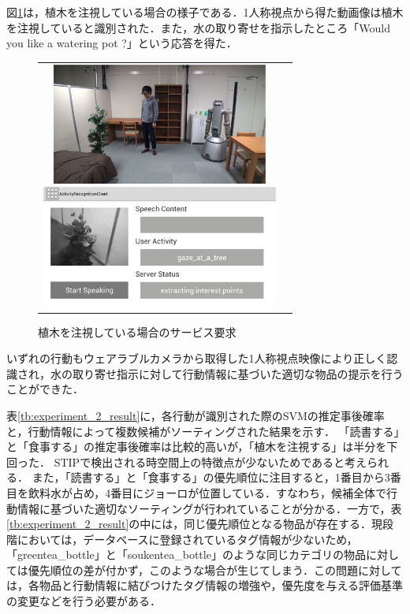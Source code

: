 \newpage
図{\ref{fig:experiment_2_water_3}}は，植木を注視している場合の様子である．1人称視点から得た動画像は植木を注視していると識別された．また，水の取り寄せを指示したところ「Would you like a watering pot ?」という応答を得た．
%
\vspace{5mm}
\begin{figure}[htbp]
\begin{tabular}{cc}
%
  \begin{minipage}{0.5\textwidth}
    \begin{center}
      \includegraphics[height=40mm]{figure/experiment_2_water_3.eps}
    \end{center}
  \end{minipage}
%
  \begin{minipage}{0.5\textwidth}
    \begin{center}
      \includegraphics[height=40mm]{figure/experiment_2_water_3_a.eps}
    \end{center}
  \end{minipage}
%
\end{tabular}
\caption{植木を注視している場合のサービス要求}
\label{fig:experiment_2_water_3}
\end{figure}

いずれの行動もウェアラブルカメラから取得した1人称視点映像により正しく認識され，水の取り寄せ指示に対して行動情報に基づいた適切な物品の提示を行うことができた．

表{\ref{tb:experiment_2_result}}に，各行動が識別された際のSVMの推定事後確率と，行動情報によって複数候補がソーティングされた結果を示す．
「読書する」と「食事する」の推定事後確率は比較的高いが，「植木を注視する」は半分を下回った．
STIPで検出される時空間上の特徴点が少ないためであると考えられる．
また，「読書する」と「食事する」の優先順位に注目すると，1番目から3番目を飲料水が占め，4番目にジョーロが位置している．すなわち，候補全体で行動情報に基づいた適切なソーティングが行われていることが分かる．一方で，表{\ref{tb:experiment_2_result}}の中には，同じ優先順位となる物品が存在する．現段階においては，データベースに登録されているタグ情報が少ないため，「greentea\_bottle」と「soukentea\_bottle」のような同じカテゴリの物品に対しては優先順位の差が付かず，このような場合が生じてしまう．この問題に対しては，各物品と行動情報に結びつけたタグ情報の増強や，優先度を与える評価基準の変更などを行う必要がある．

